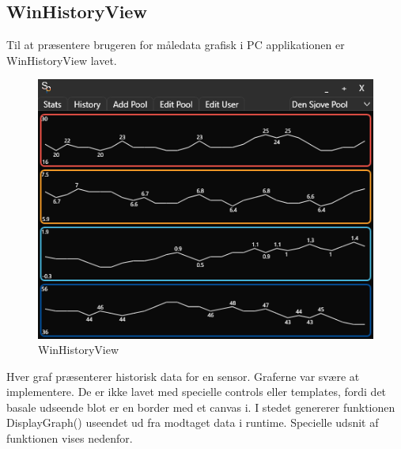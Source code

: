 \subsection{WinHistoryView}
Til at præsentere brugeren for måledata grafisk i PC applikationen er WinHistoryView lavet.
\begin{figure}
\centering
\includegraphics[width=0.6\linewidth]{figs/implementering/winhistoryview}
\caption{WinHistoryView}
\label{fig:winhistoryview}
\end{figure}
Hver graf præsenterer historisk data for en sensor.
Graferne var svære at implementere. De er ikke lavet med specielle controls eller templates, fordi det basale udseende blot er en border med et canvas i. I stedet genererer funktionen DisplayGraph() useendet ud fra modtaget data i runtime. Specielle udsnit af funktionen vises nedenfor.


